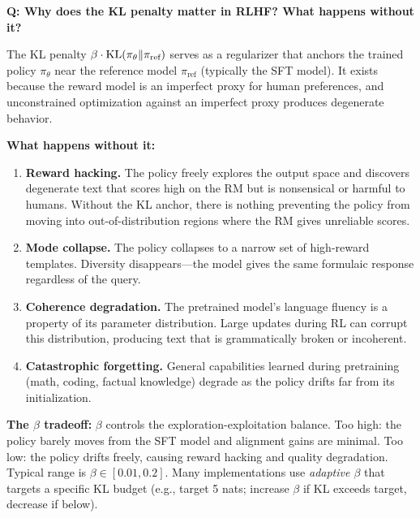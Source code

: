 
\begin{interviewq}
\textbf{Q: Why does the KL penalty matter in RLHF? What happens without it?}

 \quad {} \quad \badgefreq{\freqhigh}

\stronganswer

The KL penalty $\beta \cdot \operatorname{KL}(\pi_\theta \| \pi_{\text{ref}})$ serves as a regularizer that anchors the trained policy $\pi_\theta$ near the reference model $\pi_{\text{ref}}$ (typically the SFT model). It exists because the reward model is an imperfect proxy for human preferences, and unconstrained optimization against an imperfect proxy produces degenerate behavior.

\textbf{What happens without it:}
\begin{enumerate}
    \item \textbf{Reward hacking.} The policy freely explores the output space and discovers degenerate text that scores high on the RM but is nonsensical or harmful to humans. Without the KL anchor, there is nothing preventing the policy from moving into out-of-distribution regions where the RM gives unreliable scores.
    \item \textbf{Mode collapse.} The policy collapses to a narrow set of high-reward templates. Diversity disappears---the model gives the same formulaic response regardless of the query.
    \item \textbf{Coherence degradation.} The pretrained model's language fluency is a property of its parameter distribution. Large updates during RL can corrupt this distribution, producing text that is grammatically broken or incoherent.
    \item \textbf{Catastrophic forgetting.} General capabilities learned during pretraining (math, coding, factual knowledge) degrade as the policy drifts far from its initialization.
\end{enumerate}

\textbf{The $\beta$ tradeoff:} $\beta$ controls the exploration-exploitation balance. Too high: the policy barely moves from the SFT model and alignment gains are minimal. Too low: the policy drifts freely, causing reward hacking and quality degradation. Typical range is $\beta \in [0.01, 0.2]$. Many implementations use \textit{adaptive $\beta$} that targets a specific KL budget (e.g., target 5 nats; increase $\beta$ if KL exceeds target, decrease if below).


\end{interviewq}
